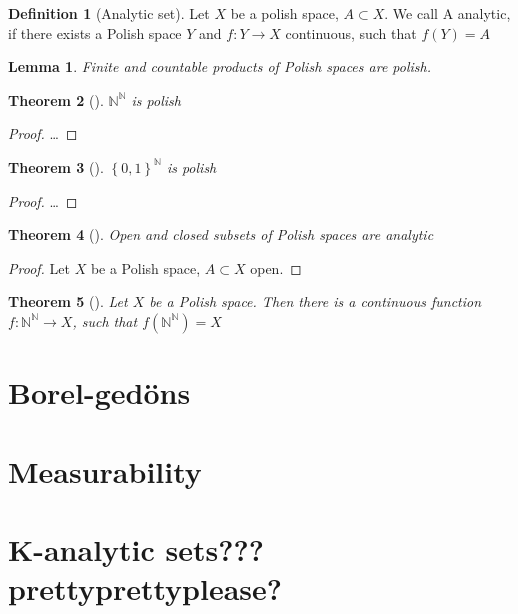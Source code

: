 \documentclass[12pt,a4paper]{article}
\newtheorem{theorem}{Theorem}[section]
\newtheorem{lemma}[theorem]{Lemma}
\theoremstyle{remark}
\theoremstyle{definition}
\newtheorem{definition}{Definition}[section]
\begin{document}
\begin{definition}[Analytic set]
	Let $X$ be a polish space, $A \subset X$. We call A analytic, if there exists a Polish space $Y$ and  $f:Y \to X$ continuous, such that  $f(Y) = A$

\end{definition}


\begin{lemma}
	Finite and countable products of Polish spaces are polish.
\end{lemma}


\begin{theorem}[]
	$\mathbb{N}^\mathbb{N}$ is polish
\end{theorem}
\begin{proof}
	\ldots		
\end{proof}

\begin{theorem}[]
	$\left\{ 0,1 \right\}^\mathbb{N}$ is polish
\end{theorem}
\begin{proof}
	\ldots	
\end{proof}

\begin{theorem}[]
	Open and closed subsets of Polish spaces are analytic
\end{theorem}
\begin{proof}
	Let $X$ be a Polish space, $A \subset X$ open.
\end{proof}

\begin{theorem}[]
	Let $X$ be a Polish space. Then there is a continuous function $f: \mathbb{N}^\mathbb{N} \to X $, such that $f\left( \mathbb{N}^\mathbb{N} \right) = X$
\end{theorem}


\section{Borel-gedöns}

\section{Measurability}



\section{K-analytic sets??? prettyprettyplease?}
\end{document}

